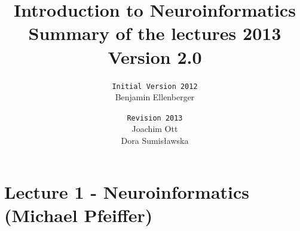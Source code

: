 \documentclass[english,11pt]{article}
\title{\textbf{Introduction to Neuroinformatics}
				\\Summary of the lectures 2013\\\normalsize Version 2.0}
\author{
\texttt{Initial Version 2012}\\
  Benjamin Ellenberger
  \and
   \texttt{Revision 2013}\\
  Joachim Ott\\Dora Sumisławska}
\date{}
\begin{document}
\maketitle
\thispagestyle{empty}

\clearpage
{}
\tableofcontents



\clearpage
{}


\pagestyle{fancy}
\fancyhead[R]{} %

\fancyhead[L]{\fontsize{10}{12}\selectfont \leftmark} %
\rfoot{\thepage}
\cfoot{} %
\renewcommand{\footrulewidth}{0pt}







\section{Lecture 1 - Neuroinformatics (Michael Pfeiffer)}
\end{document}
